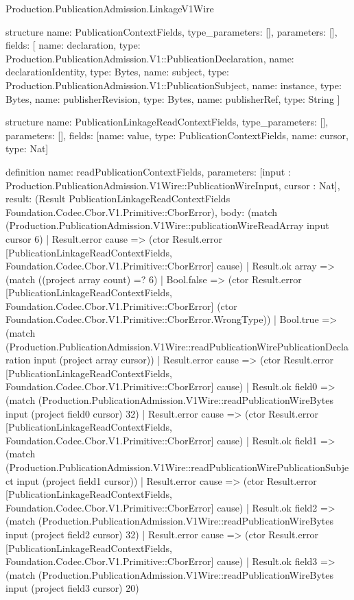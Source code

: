 \begin{lexlean}{Production.PublicationAdmission.LinkageV1Wire}
\begin{semanticmodule}
structure{
  name: PublicationContextFields,
  type_parameters: [],
  parameters: [],
  fields: [
    {name: declaration, type: Production.PublicationAdmission.V1::PublicationDeclaration},
    {name: declarationIdentity, type: Bytes},
    {name: subject, type: Production.PublicationAdmission.V1::PublicationSubject},
    {name: instance, type: Bytes},
    {name: publisherRevision, type: Bytes},
    {name: publisherRef, type: String}
  ]
}

structure{
  name: PublicationLinkageReadContextFields,
  type_parameters: [],
  parameters: [],
  fields: [{name: value, type: PublicationContextFields}, {name: cursor, type: Nat}]
}

definition{
  name: readPublicationContextFields,
  parameters: [input : Production.PublicationAdmission.V1Wire::PublicationWireInput, cursor : Nat],
  result: (Result PublicationLinkageReadContextFields Foundation.Codec.Cbor.V1.Primitive::CborError),
  body: (match (Production.PublicationAdmission.V1Wire::publicationWireReadArray input cursor 6)
    | Result.error cause => (ctor Result.error [PublicationLinkageReadContextFields, Foundation.Codec.Cbor.V1.Primitive::CborError] cause)
    | Result.ok array => (match ((project array count) =? 6)
      | Bool.false => (ctor Result.error [PublicationLinkageReadContextFields, Foundation.Codec.Cbor.V1.Primitive::CborError] (ctor Foundation.Codec.Cbor.V1.Primitive::CborError.WrongType))
      | Bool.true => (match (Production.PublicationAdmission.V1Wire::readPublicationWirePublicationDeclaration input (project array cursor))
        | Result.error cause => (ctor Result.error [PublicationLinkageReadContextFields, Foundation.Codec.Cbor.V1.Primitive::CborError] cause)
        | Result.ok field0 => (match (Production.PublicationAdmission.V1Wire::readPublicationWireBytes input (project field0 cursor) 32)
          | Result.error cause => (ctor Result.error [PublicationLinkageReadContextFields, Foundation.Codec.Cbor.V1.Primitive::CborError] cause)
          | Result.ok field1 => (match (Production.PublicationAdmission.V1Wire::readPublicationWirePublicationSubject input (project field1 cursor))
            | Result.error cause => (ctor Result.error [PublicationLinkageReadContextFields, Foundation.Codec.Cbor.V1.Primitive::CborError] cause)
            | Result.ok field2 => (match (Production.PublicationAdmission.V1Wire::readPublicationWireBytes input (project field2 cursor) 32)
              | Result.error cause => (ctor Result.error [PublicationLinkageReadContextFields, Foundation.Codec.Cbor.V1.Primitive::CborError] cause)
              | Result.ok field3 => (match (Production.PublicationAdmission.V1Wire::readPublicationWireBytes input (project field3 cursor) 20)
}
\end{semanticmodule}
\end{lexlean}
